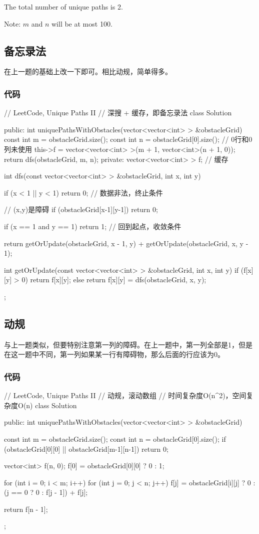 The total number of unique paths is 2.

Note: $m$ and $n$ will be at most 100.


\subsection{备忘录法}
在上一题的基础上改一下即可。相比动规，简单得多。

\subsubsection{代码}
\begin{Code}
	// LeetCode, Unique Paths II
	// 深搜 + 缓存，即备忘录法
	class Solution {
		public:
		int uniquePathsWithObstacles(vector<vector<int> > &obstacleGrid) {
			const int m = obstacleGrid.size();
			const int n = obstacleGrid[0].size();
			// 0行和0列未使用
			this->f = vector<vector<int> >(m + 1, vector<int>(n + 1, 0));
			return dfs(obstacleGrid, m, n);
		}
		private:
		vector<vector<int> > f;  // 缓存
		
		int dfs(const vector<vector<int> > &obstacleGrid,
		int x, int y) {
			if (x < 1 || y < 1) return 0; // 数据非法，终止条件
			
			// (x,y)是障碍
			if (obstacleGrid[x-1][y-1]) return 0;
			
			if (x == 1 and y == 1) return 1; // 回到起点，收敛条件
			
			return getOrUpdate(obstacleGrid, x - 1, y) +
			getOrUpdate(obstacleGrid, x, y - 1);
		}
		
		int getOrUpdate(const vector<vector<int> > &obstacleGrid,
		int x, int y) {
			if (f[x][y] > 0) return f[x][y];
			else return f[x][y] = dfs(obstacleGrid, x, y);
		}
	};
\end{Code}


\subsection{动规}
与上一题类似，但要特别注意第一列的障碍。在上一题中，第一列全部是1，但是在这一题中不同，第一列如果某一行有障碍物，那么后面的行应该为0。


\subsubsection{代码}
\begin{Code}
	// LeetCode, Unique Paths II
	// 动规，滚动数组
	// 时间复杂度O(n^2)，空间复杂度O(n)
	class Solution {
		public:
		int uniquePathsWithObstacles(vector<vector<int> > &obstacleGrid) {
			const int m = obstacleGrid.size();
			const int n = obstacleGrid[0].size();
			if (obstacleGrid[0][0] || obstacleGrid[m-1][n-1]) return 0;
			
			vector<int> f(n, 0);
			f[0] = obstacleGrid[0][0] ? 0 : 1;
			
			for (int i = 0; i < m; i++)
			for (int j = 0; j < n; j++)
			f[j] = obstacleGrid[i][j] ? 0 : (j == 0 ? 0 : f[j - 1]) + f[j];
			
			return f[n - 1];
		}
	};
\end{Code}


